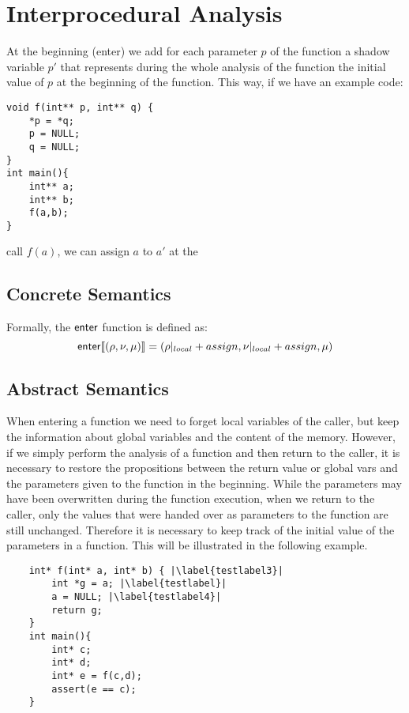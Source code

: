 \section{Interprocedural Analysis}

At the beginning (enter) we add for each parameter $p$ of the function a
shadow variable $p'$ that represents during the whole analysis of the function
the initial value of $p$ at the beginning of the function.
This way, if we have an example code:

\begin{verbatim}
void f(int** p, int** q) {
    *p = *q;
    p = NULL;
    q = NULL;
}
int main(){
    int** a;
    int** b;
    f(a,b);
}
\end{verbatim}

call $f(a)$, we can assign $a$ to $a'$ at the

\subsection{Concrete Semantics}
Formally, the $\textsf{enter}$ function is defined as:
\[
    \textsf{enter} \llbracket(\rho, \nu, \mu)\rrbracket = (\rho|_{local}+assign,\nu|_{local}+assign, \mu)
\]



\subsection{Abstract Semantics}

When entering a function we need to forget local variables of the caller, but keep the information about
global variables and the content of the memory.
However, if we simply perform the analysis of a function and then return to the caller,
it is necessary to restore the propositions between the return value or global vars and
the parameters given to the function in the beginning.
While the parameters may have been overwritten during the function execution,
when we return to the caller, only the values that were handed over as parameters to the
function are still unchanged.
Therefore it is necessary to keep track of the initial value of the parameters in a function.
This will be illustrated in the following example.

\begin{verbatim}
    int* f(int* a, int* b) { |\label{testlabel3}|
        int *g = a; |\label{testlabel}|
        a = NULL; |\label{testlabel4}|
        return g;
    }
    int main(){
        int* c;
        int* d;
        int* e = f(c,d);
        assert(e == c);
    }
\end{verbatim}

